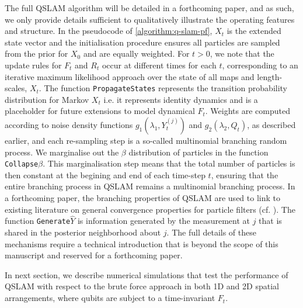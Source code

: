 The full QSLAM algorithm will be detailed in a forthcoming paper, and as such, we only provide details sufficient to qualitatively illustrate the operating features and structure. In the pseudocode of \cref{algorithm:q-slam-pf}, $X_t$ is the extended state vector and the initialisation procedure ensures all particles are sampled from the prior for $X_0$ and are equally weighted. For $t>0$, we note that the update rules for $F_t$ and $R_t$ occur at different times for each $t$, corresponding to an iterative maximum likelihood approach over the state of all maps and length-scales, $X_t$. The function \texttt{PropagateStates} represents the transition probability distribution for Markov $X_t$ i.e. it represents identity dynamics and is a placeholder for future extensions to model dynamical $F_t$. Weights are computed according to noise density functions  $g_1(\lambda_1, Y_t^{(j)})$ and $g_2(\lambda_2, Q_t)$, as described earlier, and each re-sampling step is a so-called multinomial branching random process. We marginalise out the $\beta$ distribution of particles in the function \texttt{Collapse$\beta$}. This marginalisation step  means that the total number of particles is then constant at the begining and end of each time-step $t$, ensuring that the entire branching process in QSLAM remains a multinomial branching process. In a forthcoming paper, the branching properties of QSLAM are used to link to existing literature on general convergence properties for particle filters (cf. \cite{bain2009}).  The function \texttt{Generate$\hat{Y}$} is information generated by the measurement at $j$ that is shared in the posterior neighborhood about $j$. The full details of these mechanisms require a technical introduction that is beyond the scope of this manuscript and reserved for a forthcoming paper. 

In next section, we describe numerical simulations that test the performance of QSLAM with respect to the brute force approach in both 1D and 2D spatial arrangements, where qubits are subject to a time-invariant $F_t$. 


